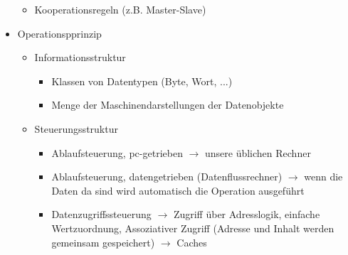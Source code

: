 \begin{itemize}
\begin{itemize}
\begin{itemize}
\begin{itemize}
				\end{itemize}
			\end{itemize}
			\item Kooperationsregeln (z.B. Master-Slave)
		\end{itemize}
		\item Operationspprinzip
		\begin{itemize}
			\item Informationsstruktur
			\begin{itemize}
				\item Klassen von Datentypen (Byte, Wort, ...)
				\item Menge der Maschinendarstellungen der Datenobjekte
			\end{itemize}
			\item Steuerungsstruktur
			\begin{itemize}
				\item Ablaufsteuerung, pc-getrieben \(\to\) unsere üblichen Rechner 
				\item Ablaufsteuerung, datengetrieben (Datenflussrechner) \(\to\) wenn die Daten da sind wird automatisch die Operation ausgeführt
				\item Datenzugriffssteuerung  \(\to\) Zugriff über Adresslogik, einfache Wertzuordnung, Assoziativer Zugriff (Adresse und Inhalt werden gemeinsam gespeichert) \(\to\) Caches
			\end{itemize}
		\end{itemize}
	\end{itemize}
